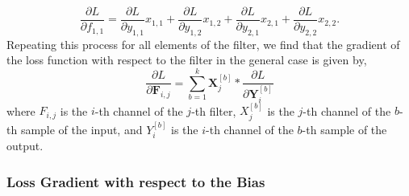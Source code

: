 \documentclass[twocolumn,pra,floatfix]{revtex4-2}
\begin{document}
                \begin{equation}
                    \frac{\partial L}{\partial f_{1,1}} = \frac{\partial L}{\partial y_{1,1}} x_{1,1} + \frac{\partial L}{\partial y_{1,2}} x_{1,2} + \frac{\partial L}{\partial y_{2,1}} x_{2,1} + \frac{\partial L}{\partial y_{2,2}} x_{2,2}.
                \end{equation}
                Repeating this process for all elements of the filter, we find that the gradient of the loss function with respect to the filter in the general case is given by,
                \begin{equation}
                    \frac{\partial L}{\partial \mathbf{F}_{i,j}} = \sum_{b=1}^{k} \mathbf{X}_{j}^{[b]} \ast \frac{\partial L}{\partial \mathbf{Y}_{i}^{[b]}}
                \end{equation}
                where $F_{i,j}$ is the $i$-th channel of the $j$-th filter, $X_{j}^{[b]}$ is the $j$-th channel of the $b$-th sample of the input, and $Y_{i}^{[b]}$ is the $i$-th channel of the $b$-th sample of the output.
                
            \subsubsection{Loss Gradient with respect to the Bias}
\end{document}
